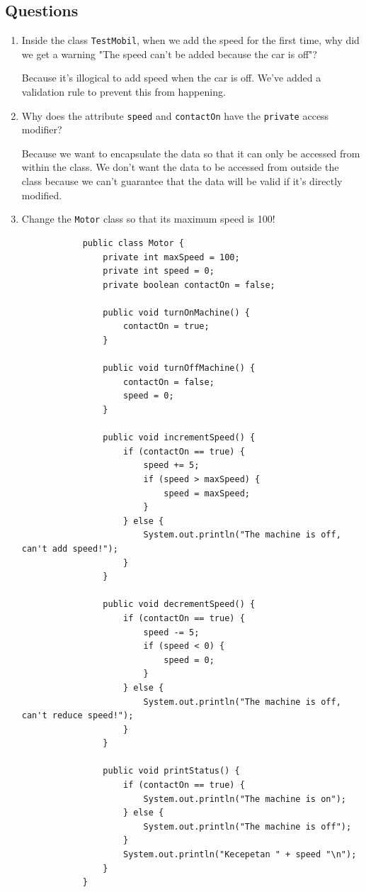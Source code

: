 \documentclass[12pt,titlepage]{article}
\begin{document}
\subsection{Questions}
\begin{enumerate}
    \item {
        Inside the class \texttt{TestMobil}, when we add the speed for the first time, why did we get
        a warning "The speed can't be added because the car is off"?

        Because it's illogical to add speed when the car is off. We've added a validation rule to prevent this
        from happening.
    }
    \item {
        Why does the attribute \texttt{speed} and \texttt{contactOn} have the \texttt{private} access modifier?

        Because we want to encapsulate the data so that it can only be accessed from within the class. We don't want
        the data to be accessed from outside the class because we can't guarantee that the data will be valid if
        it's directly modified.
    }
    \item {
        Change the \texttt{Motor} class so that its maximum speed is 100!

        \begin{verbatim}
            public class Motor {
                private int maxSpeed = 100;
                private int speed = 0;
                private boolean contactOn = false;

                public void turnOnMachine() {
                    contactOn = true;
                }

                public void turnOffMachine() {
                    contactOn = false;
                    speed = 0;
                }

                public void incrementSpeed() {
                    if (contactOn == true) {
                        speed += 5;
                        if (speed > maxSpeed) {
                            speed = maxSpeed;
                        }
                    } else {
                        System.out.println("The machine is off, can't add speed!");
                    }
                }

                public void decrementSpeed() {
                    if (contactOn == true) {
                        speed -= 5;
                        if (speed < 0) {
                            speed = 0;
                        }
                    } else {
                        System.out.println("The machine is off, can't reduce speed!");
                    }
                }

                public void printStatus() {
                    if (contactOn == true) {
                        System.out.println("The machine is on");
                    } else {
                        System.out.println("The machine is off");
                    }
                    System.out.println("Kecepetan " + speed "\n");
                }
            }
        \end{verbatim}
    }
\end{enumerate}
\end{document}
